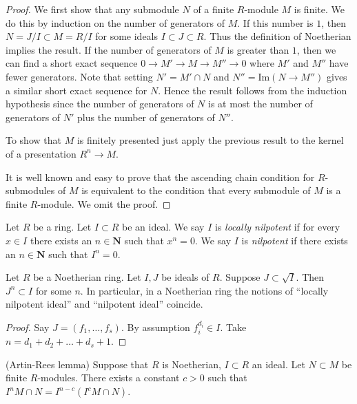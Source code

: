 \begin{proof}
We first show that any submodule $N$ of a finite $R$-module
$M$ is finite. We do this by induction on the number of
generators of $M$. If this number is $1$, then $N = J/I \subset
M = R/I$ for some ideals $I \subset J \subset R$. Thus the definition
of Noetherian implies the result. If the number of generators of
$M$ is greater than $1$, then we can find a short exact sequence
$0 \to M' \to M \to M'' \to 0$ where $M'$ and $M''$ have fewer
generators. Note that setting $N' = M' \cap N$ and $N'' = \text{Im}(N\to
M'')$ gives a similar short exact sequence for $N$. Hence the result
follows from the induction hypothesis
since the number of generators of $N$ is at most the number of
generators of $N'$ plus the number of generators of $N''$.

\medskip\noindent
To show that $M$ is finitely presented just apply the previous result
to the kernel of a presentation $R^n \to M$.

\medskip\noindent
It is well known and easy to prove that the ascending chain condition for
$R$-submodules of $M$ is equivalent to the condition that every submodule
of $M$ is a finite $R$-module. We omit the proof.
\end{proof}

\begin{definition}
\label{definition-locally-nilpotent-ideal}
Let $R$ be a ring. Let $I \subset R$ be an ideal.
We say $I$ is {\it locally nilpotent} if for every
$x \in I$ there exists an $n \in \mathbf{N}$ such
that $x^n = 0$. We say $I$ is {\it nilpotent} if
there exists an $n \in \mathbf{N}$ such that $I^n = 0$.
\end{definition}

\begin{lemma}
\label{lemma-Noetherian-power}
Let $R$ be a Noetherian ring. Let $I, J$ be ideals of $R$.
Suppose $J \subset \sqrt{I}$. Then $J^n \subset I$ for some $n$.
In particular, in a Noetherian ring the notions of
``locally nilpotent ideal''
and ``nilpotent ideal'' coincide.
\end{lemma}

\begin{proof}
Say $J = (f_1, \ldots, f_s)$.
By assumption $f_i^{d_i} \in I$.
Take $n = d_1 + d_2 + \ldots + d_s + 1$.
\end{proof}

\begin{lemma}
\label{lemma-Artin-Rees}
(Artin-Rees lemma)
Suppose that $R$ is Noetherian, $I \subset R$ an ideal.
Let $N \subset M$ be finite $R$-modules.
There exists a constant $c > 0$ such that
$I^n M \cap N  =  I^{n-c}(I^cM \cap N)$.
\end{lemma}


